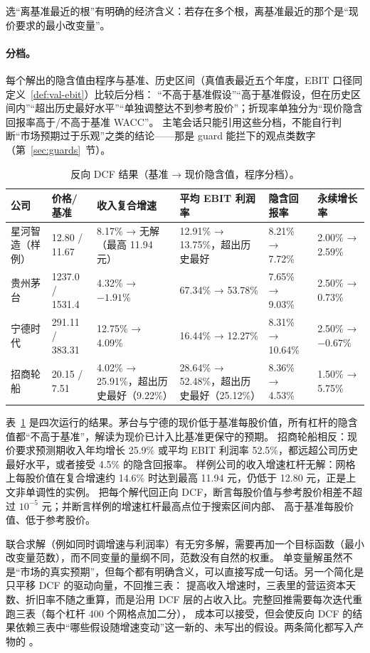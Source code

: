 选“离基准最近的根”有明确的经济含义：若存在多个根，离基准最近的那个是“现价要求的最小改变量”。

\paragraph{分档。} 每个解出的隐含值由程序与基准、历史区间（真值表最近五个年度，EBIT 口径同定义~\ref{def:val-ebit}）比较后分档：
“不高于基准假设”“高于基准假设，但在历史区间内”“超出历史最好水平”“单独调整达不到参考股价”；折现率单独分为“现价隐含回报率高于/不高于基准 WACC”。
主笔会话只能引用这些分档，不能自行判断“市场预期过于乐观”之类的结论——那是 guard 能拦下的观点类数字（第~\ref{sec:guards}~节）。

\begin{table}[t]
\centering
\caption{反向 DCF 结果（基准 → 现价隐含值，程序分档）。}
\label{tab:val-rdcf}
\footnotesize
\begin{tabularx}{\linewidth}{@{}l l X X X X@{}}
\toprule
公司 & 价格/基准 & 收入复合增速 & 平均 EBIT 利润率 & 隐含回报率 & 永续增长率 \\
\midrule
星河智造（样例） & 12.80 / 11.67 & 8.17\% → 无解（最高 11.94 元） & 12.91\% → 13.75\%，超出历史最好 & 8.21\% → 7.72\% & 2.00\% → 2.59\% \\
贵州茅台 & 1237.0 / 1531.4 & 4.32\% → $-1.91\%$ & 67.34\% → 53.78\% & 7.65\% → 9.03\% & 2.50\% → 0.73\% \\
宁德时代 & 291.11 / 383.31 & 12.75\% → 4.09\% & 16.44\% → 12.27\% & 8.31\% → 10.64\% & 2.50\% → $-0.67\%$ \\
招商轮船 & 20.15 / 7.51 & 4.02\% → 25.91\%，超出历史最好（9.22\%） & 28.64\% → 52.48\%，超出历史最好（25.12\%） & 8.36\% → 4.53\% & 1.50\% → 5.75\% \\
\bottomrule
\end{tabularx}
\end{table}

表~\ref{tab:val-rdcf} 是四次运行的结果。茅台与宁德的现价低于基准每股价值，所有杠杆的隐含值都“不高于基准”，解读为现价已计入比基准更保守的预期。
招商轮船相反：现价要求预测期收入年均增长 25.9\% 或平均 EBIT 利润率 52.5\%，都远超公司历史最好水平，或者接受 4.5\% 的隐含回报率。
样例公司的收入增速杠杆无解：网格上每股价值在复合增速约 14.6\% 时达到最高 11.94 元，仍低于 12.80 元，正是上文非单调性的实例。
 把每个解代回正向 DCF，断言每股价值与参考股价相差不超过 $10^{-5}$ 元；并断言样例的增速杠杆最高点位于搜索区间内部、
高于基准每股价值、低于参考股价。

\begin{tradeoff}
联合求解（例如同时调增速与利润率）有无穷多解，需要再加一个目标函数（最小改变量范数），而不同变量的量纲不同，范数没有自然的权重。
单变量解虽然不是“市场的真实预期”，但每个都有明确含义，可以直接写成一句话。另一个简化是只平移 DCF 的驱动向量，不回推三表：
提高收入增速时，三表里的营运资本天数、折旧率不随之重算，而是沿用 DCF 层的占收入比。完整回推需要每次迭代重跑三表（每个杠杆 400 个网格点加二分），
成本可以接受，但会使反向 DCF 的结果依赖三表中“哪些假设随增速变动”这一新的、未写出的假设。两条简化都写入产物的 。
\end{tradeoff}

